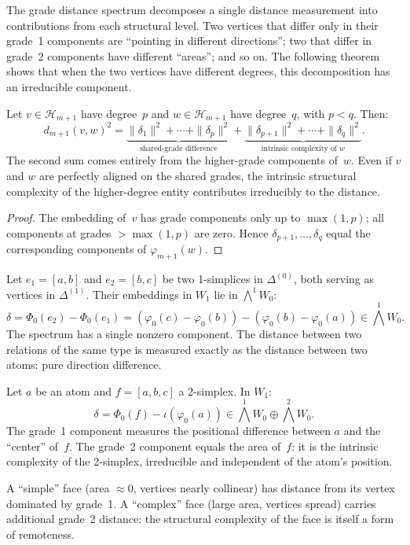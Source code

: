 The grade distance spectrum decomposes a single distance measurement into contributions from each structural level. Two vertices that differ only in their grade~1 components are ``pointing in different directions''; two that differ in grade~2 components have different ``areas''; and so on. The following theorem shows that when the two vertices have different degrees, this decomposition has an irreducible component.

\begin{theorem}\label{thm:grade-decomp}
Let $v \in \mathcal{H}_{m+1}$ have degree~$p$ and $w \in \mathcal{H}_{m+1}$ have degree~$q$, with $p < q$. Then:
\[
  d_{m+1}(v,w)^2 = \underbrace{\|\delta_1\|^2 + \cdots + \|\delta_p\|^2}_{\text{shared-grade difference}} + \underbrace{\|\delta_{p+1}\|^2 + \cdots + \|\delta_q\|^2}_{\text{intrinsic complexity of } w}.
\]
The second sum comes entirely from the higher-grade components of~$w$. Even if $v$ and $w$ are perfectly aligned on the shared grades, the intrinsic structural complexity of the higher-degree entity contributes irreducibly to the distance.
\end{theorem}

\begin{proof}
The embedding of~$v$ has grade components only up to $\max(1, p)$; all components at grades $> \max(1,p)$ are zero. Hence $\delta_{p+1}, \ldots, \delta_q$ equal the corresponding components of $\varphi_{m+1}(w)$.
\end{proof}

\begin{example}
Let $e_1 = [a,b]$ and $e_2 = [b,c]$ be two 1-simplices in $\Delta^{(0)}$, both serving as vertices in $\Delta^{(1)}$. Their embeddings in $W_1$ lie in $\bigwedge^1 W_0$:
\[
  \delta = \Phi_0(e_2) - \Phi_0(e_1) = (\varphi_0(c) - \varphi_0(b)) - (\varphi_0(b) - \varphi_0(a)) \in \textstyle\bigwedge^1 W_0.
\]
The spectrum has a single nonzero component. The distance between two relations of the same type is measured exactly as the distance between two atoms: pure direction difference.
\end{example}

\begin{example}\label{ex:cross-grade}
Let $a$ be an atom and $f = [a,b,c]$ a 2-simplex. In $W_1$:
\[
  \delta = \Phi_0(f) - \iota(\varphi_0(a)) \in \textstyle\bigwedge^1 W_0 \oplus \textstyle\bigwedge^2 W_0.
\]
The grade~1 component measures the positional difference between $a$ and the ``center'' of~$f$. The grade~2 component equals the area of~$f$: it is the intrinsic complexity of the 2-simplex, irreducible and independent of the atom's position.

A ``simple'' face (area $\approx 0$, vertices nearly collinear) has distance from its vertex dominated by grade~1. A ``complex'' face (large area, vertices spread) carries additional grade~2 distance: the structural complexity of the face is itself a form of remoteness.
\end{example}



